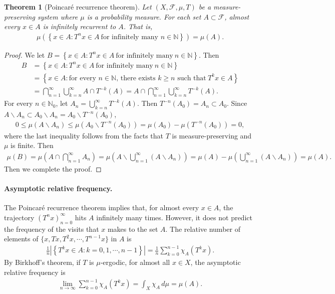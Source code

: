 \documentclass{article}
\numberwithin{equation}{section}
\newcommand{\bbN}{\mathbb{N}}
\newcommand{\scr}{\mathscr}
\theoremstyle{plain}
\newtheorem{theorem}{Theorem}[section]
\theoremstyle{definition}
\begin{document}
\begin{theorem}[Poincaré recurrence theorem]
Let $(X,\scr{F},\mu,T)$ be a measure-preserving system where $\mu$ is a probability measure. For each set $A\subset\scr{F}$, almost every $x\in A$ is infinitely recurrent to $A$. That is,
\begin{align*}
	\mu\left(\left\{x\in A:T^nx\in A\ \text{for infinitely many $n\in\bbN$}\right\}\right)=\mu(A).
\end{align*}
\end{theorem}
\begin{proof}
We let $B=\left\{x\in A:T^nx\in A\ \text{for infinitely many}\  n\in\bbN\right\}$. Then
\begin{align*}
	B&=\left\{x\in A:T^nx\in A\ \text{for infinitely many}\  n\in\bbN\right\}\\
	&=\left\{x\in A:\text{for every $n\in\bbN$, there exists $k\geq n$ such that}\ T^kx\in A\right\}\\
	&=\bigcap_{n=1}^\infty\bigcup_{k=n}^\infty A\cap T^{-k}(A)=A\cap \bigcap_{n=1}^\infty\bigcup_{k=n}^\infty T^{-k}(A).
\end{align*}
For every $n\in\bbN_0$, let $A_n=\bigcup_{k=n}^\infty T^{-k}(A)$. Then $T^{-n}(A_0)=A_n\subset A_0$. Since $A\backslash A_n\subset A_0\backslash A_n=A_0\backslash T^{-n}(A_0)$,
\begin{align*}
	0\leq\mu(A\backslash A_n)\leq\mu(A_0\backslash T^{-n}(A_0))=\mu(A_0)-\mu(T^{-n}(A_0))=0,
\end{align*}
where the last inequality follows from the facts that $T$ is measure-preserving and $\mu$ is finite. Then
\begin{align*}
	\mu(B)=\mu\left(A\cap\bigcap_{n=1}^\infty A_n\right)=\mu\left(A\backslash \bigcup_{n=1}^\infty(A\backslash A_n)\right)=\mu(A)-\mu\left(\bigcup_{n=1}^\infty(A\backslash A_n)\right)=\mu(A).
\end{align*}
Then we complete the proof.
\end{proof}

\paragraph{Asymptotic relative frequency.}  The Poincaré recurrence theorem implies that, for almost every $x\in A$, the trajectory $(T^nx)_{n=0}^\infty$ hits $A$ infinitely many times. However, it does
not predict the frequency of the visits that $x$ makes to the set $A$. The relative number of elements of $\{x,Tx,T^2x,\cdots,T^{n-1}x\}$ in $A$ is
\begin{align*}
	\frac{1}{n}\left\vert\left\{T^kx\in A:k=0,1,\cdots,n-1\right\}\right\vert=\frac{1}{n}\sum_{k=0}^{n-1}\chi_A(T^k x).
\end{align*}
By Birkhoff's theorem, if $T$ is $\mu$-ergodic, for almost all $x\in X$, the asymptotic relative frequency is
\begin{align*}
	\lim_{n\to\infty}\sum_{k=0}^{n-1}\chi_A(T^k x)=\int_X\chi_A\,d\mu=\mu(A).
\end{align*}
\end{document}
